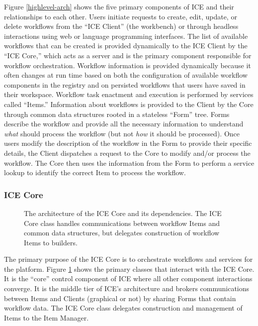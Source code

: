 Figure \ref{highlevel-arch} shows the five primary components of ICE and their relationships to each other. Users initiate requests to create, edit, update, or delete workflows from the ``ICE Client'' (the workbench) or through headless interactions using web or language programming interfaces. The list of available workflows
that can be created is provided dynamically to the ICE Client by
the ``ICE Core,'' which acts as a server and is the primary component responsible for workflow orchestration. Workflow information is
provided dynamically because it often changes at run time based on 
both the configuration of available workflow components in the registry and on
persisted workflows that users have saved in their workspace. Workflow task enactment and execution is performed by services called ``Items.'' Information about workflows is provided to the Client by the Core
through common data structures rooted in a stateless ``Form'' tree. Forms describe the workflow and provide
all the necessary information to understand \emph{what} should process
the workflow (but not \emph{how} it should be processed). Once users
modify the description of the workflow in the Form to provide their
specific details, the Client dispatches a request to the Core to modify
and/or process the workflow. The Core then uses the information from the Form
to perform a service lookup to identify the correct Item to process the workflow.

\subsubsection{ICE Core}

\begin{figure}[htbp]
\centering
{}
\caption{The architecture of the ICE Core and its dependencies. The ICE Core class handles communications between workflow Items and common data structures, but delegates construction of workflow Items to builders.}
\label{core-arch}
\end{figure}

The primary purpose of the ICE Core is to orchestrate workflows and services for the platform. Figure \ref{core-arch} shows the primary classes that interact with the ICE Core. It is the ``core'' control component of ICE where all other component interactions converge. It is the middle tier of ICE's architecture and brokers communications between Items and Clients (graphical or not) by sharing Forms that contain workflow data. The ICE Core class delegates construction and management of Items to the Item Manager. 


